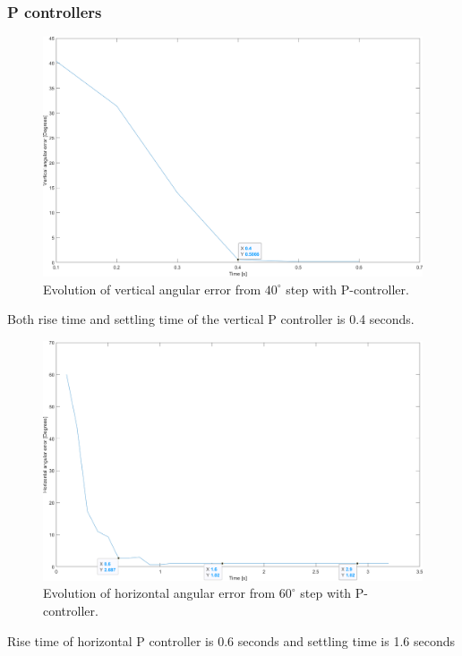 \subsubsection{P controllers}
\label{sec:simon12}
\begin{figure}[h]
\centering
\includegraphics[width=\linewidth]{sections/assets/Vertical_P_controller.png}
\caption{Evolution of vertical angular error from \(40^{\circ}\) step with P-controller.}
\label{vert_P}
\end{figure}
Both rise time and settling time of the vertical P controller is 0.4 seconds.
\begin{figure}[h]
\centering
\includegraphics[width=\linewidth]{sections/assets/Horizontal_P_controller.png}
\caption{Evolution of horizontal angular error from \(60^{\circ}\) step with P-controller.}
\label{Horizontal_P}
\end{figure}
Rise time of horizontal P controller is 0.6 seconds and settling time is 1.6 seconds

